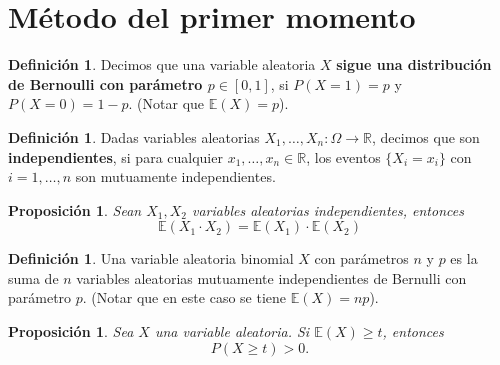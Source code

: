\documentclass[12pt]{report}
\theoremstyle{plain}
\newtheorem{proposition}[theorem]{Proposición}
\theoremstyle{definition}
\newtheorem{definition}[theorem]{Definición}
\newcommand{\reals}{\mathbb{R}}
\begin{document}
\section{Método del primer momento}



\begin{definition}
Decimos que una variable aleatoria $X$ \textbf{sigue una distribución de Bernoulli con parámetro $p\in [0,1]$}, si $P(X = 1) = p$ y $P (X = 0) = 1-p$. (Notar que $\mathbb{E} (X) = p$).
\end{definition}

\begin{definition}
Dadas variables aleatorias $X_1, \ldots, X_n : \Omega \to \reals$, decimos que son \textbf{independientes}, si para cualquier $x_1, \ldots, x_n \in \reals$, los eventos $\{X_i = x_i\}$ con $i = 1, \ldots, n$ son mutuamente independientes.
\end{definition}

\begin{proposition}
Sean $X_1, X_2$ variables aleatorias independientes, entonces
\[
    \mathbb{E} (X_1 \cdot X_2) = \mathbb{E} (X_1) \cdot \mathbb{E}(X_2)
\]
\end{proposition}

\begin{definition}
Una variable aleatoria binomial $X$ con parámetros $n$ y $p$ es la suma de $n$ variables aleatorias mutuamente independientes de Bernulli con parámetro $p$. (Notar que en este caso se tiene $\mathbb{E} (X) = np$).
\end{definition}

\begin{proposition}\label{proposition:si la esperanza es mayor que t luego la probabilidad de que X sea mayor que t es positiva}
Sea $X$ una variable aleatoria. Si $\mathbb{E} (X) \geq t$, entonces
$$P(X \geq t) > 0.$$
\end{proposition}
\end{document}
